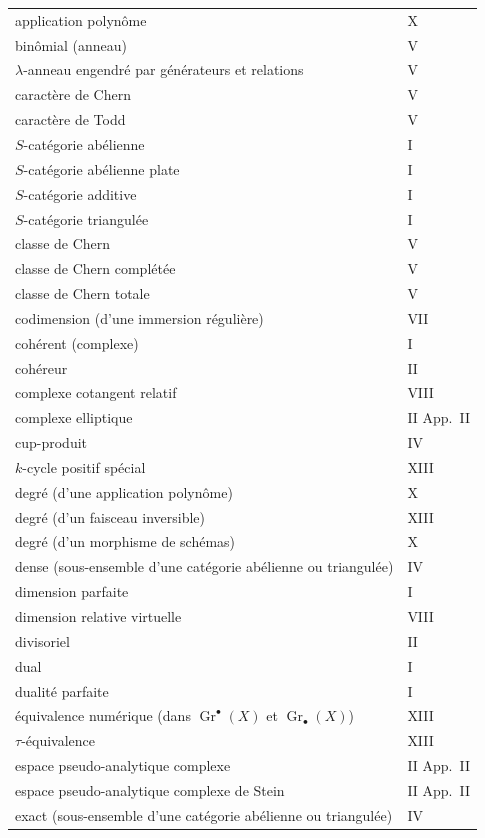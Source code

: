 \begin{longtable}{p{8cm}l}
application polyn\^ome & X \\
bin\^omial (anneau) & V \\
$\lambda$-anneau engendr\'e par g\'en\'erateurs et relations & V \\
caract\`ere de Chern & V \\
caract\`ere de Todd & V \\
$S$-cat\'egorie ab\'elienne & I \\
$S$-cat\'egorie ab\'elienne plate & I \\
$S$-cat\'egorie additive & I \\
$S$-cat\'egorie triangul\'ee & I \\
classe de Chern & V \\
classe de Chern compl\'et\'ee & V \\
classe de Chern totale & V \\
codimension (d'une immersion r\'eguli\`ere) & VII \\
coh\'erent (complexe) & I \\
coh\'ereur & II \\
complexe cotangent relatif & VIII \\
complexe elliptique & II App.\ II \\
cup-produit & IV \\
$k$-cycle positif sp\'ecial & XIII \\
degr\'e (d'une application polyn\^ome) & X \\
degr\'e (d'un faisceau inversible) & XIII \\
degr\'e (d'un morphisme de sch\'emas) & X \\
dense (sous-ensemble d'une cat\'egorie ab\'elienne ou triangul\'ee) & IV \\
dimension parfaite & I \\
dimension relative virtuelle & VIII \\
divisoriel & II \\
dual & I \\
dualit\'e parfaite & I \\
\'equivalence num\'erique (dans $\operatorname{Gr}^{\bullet}(X)$ et $\operatorname{Gr}_{\bullet}(X)$) & XIII \\
$\tau$-\'equivalence & XIII \\
espace pseudo-analytique complexe & II App.\ II \\
espace pseudo-analytique complexe de Stein & II App.\ II \\
exact (sous-ensemble d'une cat\'egorie ab\'elienne ou triangul\'ee) & IV \\

\end{longtable}
